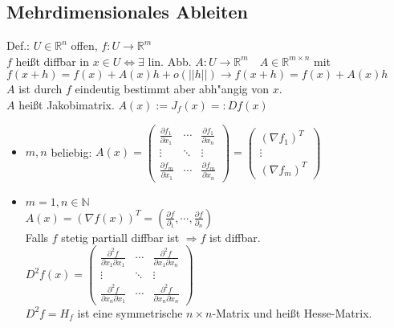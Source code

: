 \documentclass[10pt,a4paper^, twocolumn]{article}
\newcommand{\menge}{\mathbb} %
\begin{document}
\subsection{Mehrdimensionales Ableiten}
	Def.: $U \in \menge{R}^n$ offen, \quad $f:U \to \menge{R}^m$ \\
	$f$ heißt diffbar in $x \in U \Leftrightarrow \exists$ lin. Abb. $A: U \to \menge{R}^m \quad A \in \menge{R}^{m \times n}$ mit
	$f(x+h) = f(x) + A(x)h + o(||h||) \rightarrow f(x+h) = f(x) + A(x)h$ \\
	$A$ ist durch $f$ eindeutig bestimmt aber abh"angig von $x$.\\ $A$ heißt Jakobimatrix. $A(x) := J_f(x) =: Df(x)$
	\begin{itemize}
	\item $m,n$ beliebig: $A(x) = \begin{pmatrix}
			\frac{\partial f_1}{\partial x_1} 	& \cdots 	& \frac{\partial f_1}{\partial x_n} \\
			\vdots					& \ddots	& \vdots	\\
			\frac{\partial f_m}{\partial x_1}	& \cdots	& \frac{\partial f_m}{\partial x_n}
		\end{pmatrix} = \begin{pmatrix}
			(\nabla f_1)^T \\
			\vdots \\
			(\nabla f_m)^T
		\end{pmatrix}$
	\item $m = 1, n \in \menge{N}$ \\
		$A(x) = (\nabla f(x))^T = \left ( \frac{\partial f}{\partial_1}, \cdots, \frac{\partial f}{\partial_n} \right )$ \\
		Falls $f$ stetig partiall diffbar ist $\Rightarrow f$ ist diffbar. \\
		$D^2 f(x) = \begin{pmatrix}
			\frac{\partial^2 f}{\partial x_1 \partial x_1} 	& \cdots	& \frac{\partial^2 f}{\partial x_1 \partial x_n} \\
			\vdots						& \ddots	& \vdots	\\
			\frac{\partial^2 f}{\partial x_n \partial x_1} 	& \cdots	& \frac{\partial^2 f}{\partial x_n \partial x_n}
		\end{pmatrix}$ \\
		$D^2 f = H_f$ ist eine symmetrische $n \times n$-Matrix und heißt Hesse-Matrix.
	\end{itemize}
\end{document}
